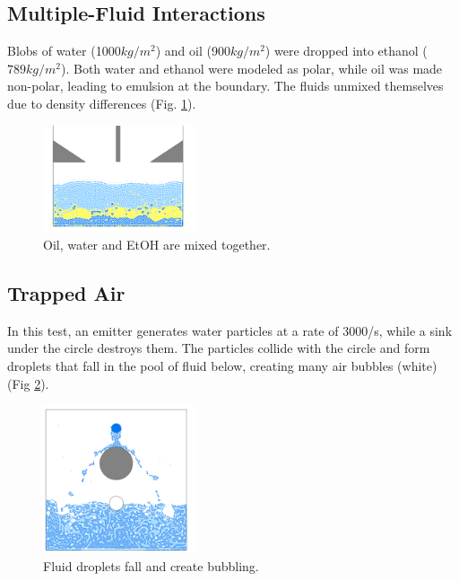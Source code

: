 \documentclass[acmtog,review]{acmart}
\begin{document}
\subsection{Multiple-Fluid Interactions}
Blobs of water (1000$kg/m^2$) and oil (900$kg/m^2$) were dropped into ethanol ($789kg/m^2$). Both water and ethanol were modeled as polar, while oil was made non-polar, leading to emulsion at the boundary. The fluids unmixed themselves due to density differences (Fig. \ref{interface}). 
\begin{figure}[h]
  \includegraphics[width=0.4\textwidth]{interface.PNG}
  \caption{Oil, water and EtOH are mixed together.}
  \label{interface}
\end{figure}

\subsection{Trapped Air}
In this test, an emitter generates water particles at a rate of 3000/s, while a sink under the circle destroys them. The particles collide with the circle and form droplets that fall in the pool of fluid below, creating many air bubbles (white) (Fig \ref{bubbles}).
\begin{figure}[h]
  \includegraphics[width=0.4\textwidth]{bubbles.PNG}
  \caption{Fluid droplets fall and create bubbling.}
  \label{bubbles}
\end{figure}
\end{document}
